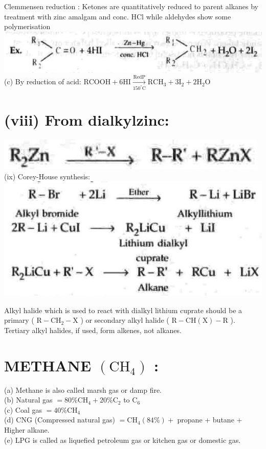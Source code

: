 \documentclass[10pt]{article}
\begin{document}
Clemmensen reduction : Ketones are quantitatively reduced to parent alkanes by treatment with zinc amalgam and conc. HCl while aldehydes show some polymerisation\\
\includegraphics[max width=\textwidth, center]{2025_01_28_8470952b98110cec3aabg-172(4)}\\
(c) By reduction of acid: $\mathrm{RCOOH}+6 \mathrm{HI} \xrightarrow[150^{\circ} \mathrm{C}]{\mathrm{Red} \mathrm{P}} \mathrm{RCH}_{3}+3 \mathrm{I}_{2}+2 \mathrm{H}_{2} \mathrm{O}$

\section*{(viii) From dialkylzinc:}
\includegraphics[max width=\textwidth, center]{2025_01_28_8470952b98110cec3aabg-172}\\
(ix) Corey-House synthesis:\\
\includegraphics[max width=\textwidth, center]{2025_01_28_8470952b98110cec3aabg-172(2)}

Alkyl halide which is used to react with dialkyl lithium cuprate should be a primary ( $\mathrm{R}-\mathrm{CH}_{2}-\mathrm{X}$ ) or secondary alkyl halide ( $\mathrm{R}-\mathrm{CH}(\mathrm{X})-\mathrm{R}$ ). Tertiary alkyl halides, if used, form alkenes, not alkanes.

\section*{METHANE $\left(\mathrm{CH}_{4}\right)$ :}
(a) Methane is also called marsh gas or damp fire.\\
(b) Natural gas $=80 \% \mathrm{CH}_{4}+20 \% \mathrm{C}_{2}$ to $\mathrm{C}_{6}$\\
(c) Coal gas $=40 \% \mathrm{CH}_{4}$\\
(d) CNG (Compressed natural gas) $=\mathrm{CH}_{4}(84 \%)+$ propane + butane + Higher alkane.\\
(e) LPG is called as liquefied petroleum gas or kitchen gas or domestic gas.
\end{document}
